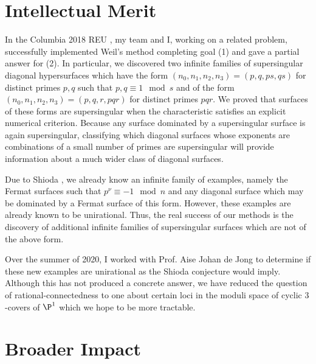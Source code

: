 \documentclass[10pt]{amsart}
\begin{document}
\section*{Intellectual Merit}

In the Columbia 2018 REU \cite{REU}, my team and I, working on a related problem, successfully implemented Weil's method completing goal (1) and gave a partial answer for (2). In particular, we discovered two infinite families of supersingular diagonal hypersurfaces which have the form $(n_0, n_1, n_2, n_3) = (p, q, ps, qs)$ for distinct primes $p,q$ such that $p,q \equiv 1 \mod s$ and of the form $(n_0, n_1, n_2, n_3) = (p, q, r, pqr)$ for distinct primes $pqr$. We proved that surfaces of these forms are supersingular when the characteristic satisfies an explicit numerical criterion. Because any surface dominated by a supersingular surface is again supersingular, classifying which diagonal surfaces whose exponents are combinations of a small number of primes are supersingular will provide information about a much wider class of diagonal surfaces.  
\par
Due to Shioda \cite{shioda_on_fermat}, we already know an infinite family of examples, namely the Fermat surfaces such that $p^\nu \equiv - 1 \mod n$ and any diagonal surface which may be dominated by a Fermat surface of this form. However, these examples are already known to be unirational. Thus, the real success of our methods is the discovery of additional infinite families of supersingular surfaces which are not of the above form. 
\par
Over the summer of 2020, I worked with Prof. Aise Johan de Jong to determine if these new examples are unirational as the Shioda conjecture would imply. Although this has not produced a concrete answer, we have reduced the question of rational-connectedness to one about certain loci in the moduli space of cyclic $3$-covers of $\P^1$ which we hope to be more tractable.

\section*{Broader Impact}
\end{document}
